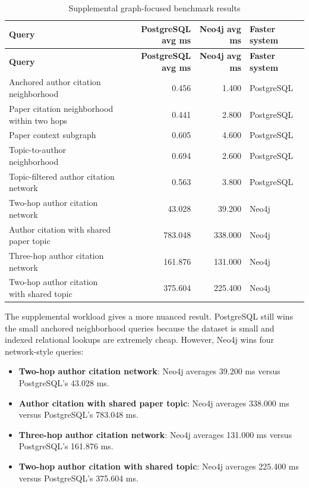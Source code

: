 \documentclass[11pt]{article}
\begin{document}
\small
\setlength{\tabcolsep}{3pt}
\begin{longtable}{|p{}|r|r|p{}|}
\caption{Supplemental graph-focused benchmark results}
\label{tab:graph-focused-results}\\
\hline
\textbf{Query} & \textbf{PostgreSQL avg ms} & \textbf{Neo4j avg ms} & \textbf{Faster system} \\
\hline
\endfirsthead
\hline
\textbf{Query} & \textbf{PostgreSQL avg ms} & \textbf{Neo4j avg ms} & \textbf{Faster system} \\
\hline
\endhead
Anchored author citation neighborhood & 0.456 & 1.400 & PostgreSQL \\
\hline
Paper citation neighborhood within two hops & 0.441 & 2.800 & PostgreSQL \\
\hline
Paper context subgraph & 0.605 & 4.600 & PostgreSQL \\
\hline
Topic-to-author neighborhood & 0.694 & 2.600 & PostgreSQL \\
\hline
Topic-filtered author citation network & 0.563 & 3.800 & PostgreSQL \\
\hline
Two-hop author citation network & 43.028 & 39.200 & Neo4j \\
\hline
Author citation with shared paper topic & 783.048 & 338.000 & Neo4j \\
\hline
Three-hop author citation network & 161.876 & 131.000 & Neo4j \\
\hline
Two-hop author citation with shared topic & 375.604 & 225.400 & Neo4j \\
\hline
\end{longtable}
\normalsize
\setlength{\tabcolsep}{6pt}

The supplemental workload gives a more nuanced result.
PostgreSQL still wins the small anchored neighborhood queries because the dataset is small and indexed relational lookups are extremely cheap.
However, Neo4j wins four network-style queries:

\begin{itemize}
    \item \textbf{Two-hop author citation network}: Neo4j averages 39.200 ms versus PostgreSQL's 43.028 ms.
    \item \textbf{Author citation with shared paper topic}: Neo4j averages 338.000 ms versus PostgreSQL's 783.048 ms.
    \item \textbf{Three-hop author citation network}: Neo4j averages 131.000 ms versus PostgreSQL's 161.876 ms.
    \item \textbf{Two-hop author citation with shared topic}: Neo4j averages 225.400 ms versus PostgreSQL's 375.604 ms.
\end{itemize}
\end{document}
